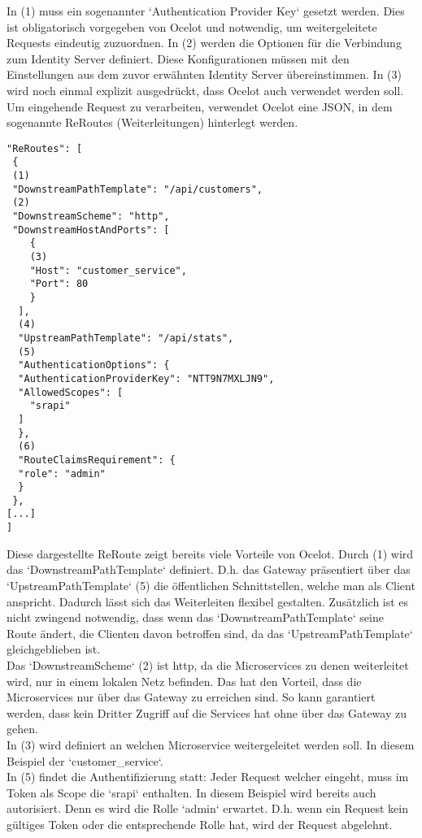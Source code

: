 In (1) muss ein sogenannter `Authentication Provider Key` gesetzt werden. Dies ist obligatorisch vorgegeben von Ocelot und notwendig, um weitergeleitete Requests eindeutig zuzuordnen. In (2) werden die Optionen für die Verbindung zum Identity Server definiert. Diese Konfigurationen müssen mit den Einstellungen aus dem zuvor erwähnten Identity Server übereinstimmen. In (3) wird noch einmal explizit ausgedrückt, dass Ocelot auch verwendet werden soll. \\

Um eingehende Request zu verarbeiten, verwendet Ocelot eine JSON, in dem sogenannte ReRoutes (Weiterleitungen) hinterlegt werden. 

\begin{verbatim}
"ReRoutes": [
 {
 (1)
 "DownstreamPathTemplate": "/api/customers",
 (2)
 "DownstreamScheme": "http",
 "DownstreamHostAndPorts": [
    {
    (3)
    "Host": "customer_service",
    "Port": 80
    }
  ],
  (4)
  "UpstreamPathTemplate": "/api/stats",
  (5)
  "AuthenticationOptions": {
  "AuthenticationProviderKey": "NTT9N7MXLJN9",
  "AllowedScopes": [
    "srapi"
  ]
  },
  (6)
  "RouteClaimsRequirement": {
  "role": "admin"
  }
 },
[...]
]
\end{verbatim}

Diese dargestellte ReRoute zeigt bereits viele Vorteile von Ocelot. Durch (1) wird das `DownstreamPathTemplate` definiert. D.h. das Gateway präsentiert über das `UpstreamPathTemplate` (5) die öffentlichen Schnittstellen, welche man als Client anspricht. Dadurch lässt sich das Weiterleiten flexibel gestalten. Zusätzlich ist es nicht zwingend notwendig, dass wenn das `DownstreamPathTemplate` seine Route ändert, die Clienten davon betroffen sind, da das `UpstreamPathTemplate` gleichgeblieben ist. \\

Das `DownstreamScheme` (2) ist http, da die Microservices zu denen weiterleitet wird, nur in einem lokalen Netz befinden. Das hat den Vorteil, dass die Microservices nur über das Gateway zu erreichen sind. So kann garantiert werden, dass kein Dritter Zugriff auf die Services hat ohne über das Gateway zu gehen. \\

In (3) wird definiert an welchen Microservice weitergeleitet werden soll. In diesem Beispiel der `customer\_service`.\\

In (5) findet die Authentifizierung statt: Jeder Request welcher eingeht, muss im Token als Scope die `srapi` enthalten. In diesem Beispiel wird bereits auch autorisiert. Denn es wird die Rolle `admin` erwartet. D.h. wenn ein Request kein gültiges Token oder die entsprechende Rolle hat, wird der Request abgelehnt. \\


